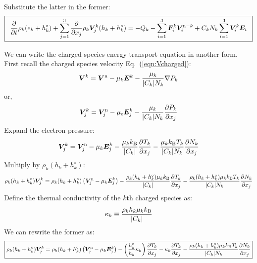 \documentclass{warpdoc}
\newcommand\frameeqn[1]{\fbox{$\displaystyle #1$}}
\newcommand{\mfd}{\displaystyle}
\renewcommand{\vec}[1]{\bm{#1}}
\begin{document}
%
Substitute the latter in the former:
%
\begin{equation}
\frameeqn{
\begin{array}{l}\mfd
 \frac{\partial }{\partial t}\rho_k (e_k+h_k^\circ) + \sum_{j=1}^3  \frac{\partial }{\partial x_j} \rho_k \vec{V}^k_j (h_k+h_k^\circ) 
= 
- Q_{k}
-\sum_{i=1}^3 \vec{F}_i^k \vec{V}_i^{{\rm n}-k} 
+ C_k N_k \sum_{i=1}^3 \vec{V}^k_i \vec{E}_i
\end{array}
}
\label{eqn:echarged5}
\end{equation}
%  

We can write the charged species energy transport equation in another form. First recall the charged species velocity Eq.\ (\ref{eqn:Vcharged}):
%
\begin{equation}
  \vec{V}^{k}=\vec{V}^{\rm n} - \mu_{k} \vec{E}^{k} -\frac{\mu_{k}}{|C_{k}| N_{k}}\nabla P_{k}
\end{equation}
% 
or,
%
\begin{equation}
  \vec{V}^{k}_j=\vec{V}^{\rm n}_j - \mu_{\rm e} \vec{E}^{k}_j -\frac{\mu_{k}}{|C_{k}| N_{k}} \frac{\partial P_{k}}{\partial x_j} 
\end{equation}
% 
Expand the electron pressure:
%
\begin{equation}
  \vec{V}^{k}_j=\vec{V}^{\rm n}_j - \mu_{k} \vec{E}^{k}_j 
    -\frac{\mu_{k} k_{\rm B}}{|C_{k}| } \frac{  \partial T_{k}}{\partial x_j} 
    -\frac{\mu_{k} k_{\rm B} T_{k}}{|C_{k}| N_{k}} \frac{\partial N_{k}  }{\partial x_j} 
\end{equation}
% 
Multiply by $\rho_{k} (h_{k}+h_k^\circ)$:
%
\begin{equation}
  \rho_{k} (h_{k}+h_k^\circ) \vec{V}^{k}_j
  = \rho_{k} (h_{k}+h_k^\circ)\left( \vec{V}^{\rm n}_j 
  - \mu_{k} \vec{E}^{k}_j \right)
  -\frac{\rho_{k} (h_{k}+h_k^\circ) \mu_{k} k_{\rm B}}{|C_{k}| } \frac{  \partial T_{k}}{\partial x_j} 
  -\frac{\rho_{k} (h_{k}+h_k^\circ) \mu_{k} k_{\rm B} T_{k}}{|C_{k}| N_{k}} \frac{\partial N_{k}  }{\partial x_j} 
\end{equation}
%
Define the thermal conductivity of the $k$th charged species as:
%
\begin{equation}
\kappa_k \equiv \frac{\rho_{k} {h}_{k} \mu_{k} k_{\rm B}}{|C_{k}| }
\end{equation}
%
We can rewrite the former as:
%
\begin{equation}
\frameeqn{
  \rho_{k} (h_{k}+h_k^\circ) \vec{V}^{k}_j
  = \rho_{k} (h_{k}+h_k^\circ)\left( \vec{V}^{\rm n}_j 
  - \mu_{k} \vec{E}^{k}_j \right)
  -\left( \frac{ h_k^\circ }{h_k }\kappa_k \right)\frac{  \partial T_{k}}{\partial x_j} 
  -\kappa_k \frac{  \partial T_{k}}{\partial x_j} 
  -\frac{\rho_{k} (h_{k}+h_k^\circ) \mu_{k} k_{\rm B} T_{k}}{|C_{k}| N_{k}} \frac{\partial N_{k}  }{\partial x_j} 
}
\end{equation}
%
\end{document}
